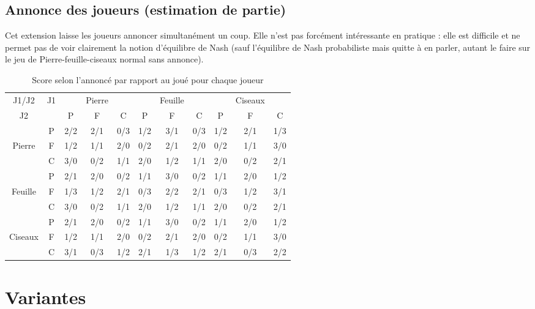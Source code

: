 \documentclass{article}
\begin{document}
\subsection{Annonce des joueurs (estimation de partie)}

Cet extension laisse les joueurs annoncer simultanément un coup. Elle n'est pas forcément intéressante en pratique : elle est difficile et ne permet pas de voir clairement la notion d'équilibre de Nash (sauf l'équilibre de Nash probabiliste mais quitte à en parler, autant le faire sur le jeu de Pierre-feuille-ciseaux normal sans annonce).

\begin{table}[h]
    \centering
    \begin{tabular}{cc||c|c|c||c|c|c||c|c|c|}
        J1/J2  & J1&   & Pierre &   &   & Feuille &   &   & Ciseaux &   \\ 
          J2   &   & P &   F    & C & P &    F    & C & P &    F    & C \\ \hline \hline
               & P &2/2&  2/1   &0/3&1/2&   3/1   &0/3&1/2&   2/1   &1/3\\ \hline
        Pierre & F &1/2&  1/1   &2/0&0/2&   2/1   &2/0&0/2&   1/1   &3/0\\ \hline
               & C &3/0&  0/2   &1/1&2/0&   1/2   &1/1&2/0&   0/2   &2/1\\ \hline \hline
               & P &2/1&  2/0   &0/2&1/1&   3/0   &0/2&1/1&   2/0   &1/2\\ \hline
        Feuille& F &1/3&  1/2   &2/1&0/3&   2/2   &2/1&0/3&   1/2   &3/1\\ \hline
               & C &3/0&  0/2   &1/1&2/0&   1/2   &1/1&2/0&   0/2   &2/1\\ \hline \hline
               & P &2/1&  2/0   &0/2&1/1&   3/0   &0/2&1/1&   2/0   &1/2\\ \hline
        Ciseaux& F &1/2&  1/1   &2/0&0/2&   2/1   &2/0&0/2&   1/1   &3/0\\ \hline
               & C &3/1&  0/3   &1/2&2/1&   1/3   &1/2&2/1&   0/3   &2/2\\ \hline
    \end{tabular}
    \caption{Score selon l'annoncé par rapport au joué pour chaque joueur}
\end{table}

\section{Variantes}
\end{document}

